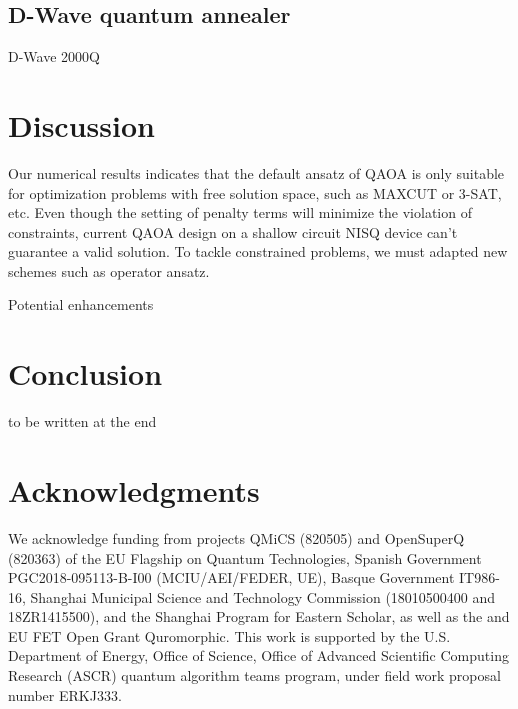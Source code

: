 \documentclass[aps,pra,twocolumn,superscriptaddress]{revtex4-2}
\begin{document}
\subsection{D-Wave quantum annealer}
D-Wave 2000Q

\section{Discussion\label{sec:dis}}
Our numerical results indicates that the default ansatz of QAOA is only suitable for optimization problems with free solution space, such as MAXCUT or 3-SAT, etc. Even though the setting of penalty terms will minimize the violation of constraints, current QAOA design on a shallow circuit NISQ device can't guarantee a valid solution. To tackle constrained problems, we must adapted new schemes such as operator ansatz.

Potential enhancements
\section{Conclusion\label{sec:conclu}}
to be written at the end
\section{Acknowledgments}
We acknowledge funding from projects QMiCS (820505) and OpenSuperQ (820363) of the EU Flagship on Quantum Technologies,  Spanish Government PGC2018-095113-B-I00 (MCIU/AEI/FEDER, UE), Basque Government IT986-16, Shanghai Municipal Science and Technology Commission (18010500400 and 18ZR1415500), and the Shanghai Program for Eastern Scholar, as well as the and EU FET Open Grant Quromorphic. This work is supported by the U.S. Department of Energy, Office of Science, Office of Advanced Scientific Computing Research (ASCR) quantum algorithm teams program, under field work proposal number ERKJ333.
\end{document}
